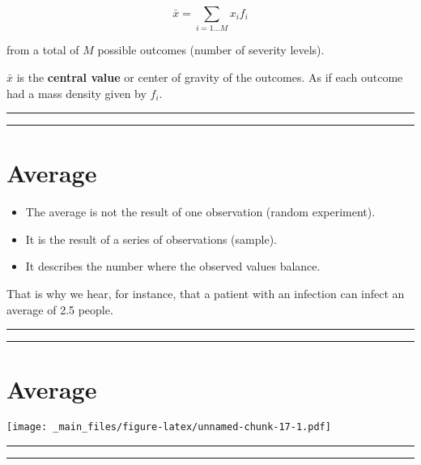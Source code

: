 \documentclass[
]{book}
\begin{document}
\[\bar{x}= \sum_{i = 1...M} x_i f_i\]

from a total of \(M\) possible outcomes (number of severity levels).

\(\bar{x}\) is the \textbf{central value} or center of gravity of the outcomes. As if each outcome had a mass density given by \(f_i\).

\begin{center}\rule{0.5\linewidth}{0.5pt}\end{center}

\begin{center}\rule{0.5\linewidth}{0.5pt}\end{center}

\hypertarget{average-1}{%
\section{Average}\label{average-1}}

\begin{itemize}
\item
  The average is not the result of one observation (random experiment).
\item
  It is the result of a series of observations (sample).
\item
  It describes the number where the observed values balance.
\end{itemize}

That is why we hear, for instance, that a patient with an infection can infect an average of 2.5 people.

\begin{center}\rule{0.5\linewidth}{0.5pt}\end{center}

\begin{center}\rule{0.5\linewidth}{0.5pt}\end{center}

\hypertarget{average-2}{%
\section{Average}\label{average-2}}

\texttt{[image: \_main\_files/figure-latex/unnamed-chunk-17-1.pdf]}

\begin{center}\rule{0.5\linewidth}{0.5pt}\end{center}

\begin{center}\rule{0.5\linewidth}{0.5pt}\end{center}
\end{document}
